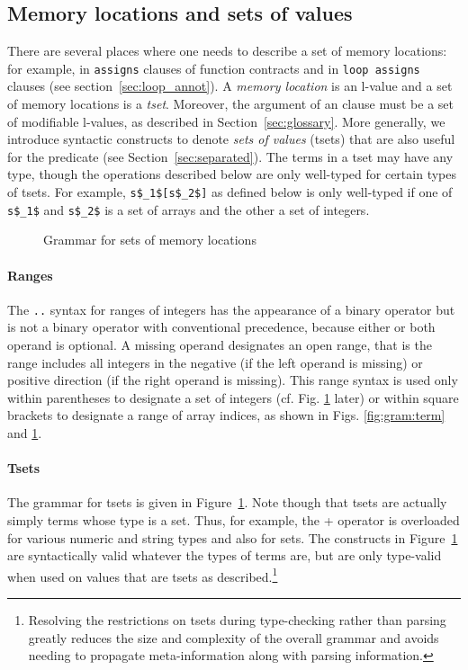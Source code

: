 \subsection{Memory locations and sets of values}
\label{sec:locations}

There are several places where one needs to describe a set of memory
locations: for example, in \lstinline|assigns| clauses of function contracts and
in \lstinline|loop assigns| clauses (see section~\ref{sec:loop_annot}).
A \emph{memory location} is an
l-value and a set of memory locations is a \emph{tset}.
Moreover, the argument of
an \assigns{} clause must be a set of modifiable l-values, as described in
Section~\ref{sec:glossary}.
More generally, we introduce syntactic constructs to denote \emph{sets of
  values} (tsets) that are also useful for the \separated predicate (see Section~\ref{sec:separated}). The terms in a tset may have any type, though the operations described below are only well-typed for certain types of tsets. For example, \lstinline|s$_1$[s$_2$]| as defined below is only well-typed if one of
\lstinline|s$_1$| and \lstinline|s$_2$| is a set of arrays and the other a set of integers.

\begin{figure}[htp]
  \begin{cadre}
      
    \end{cadre}
  \caption{Grammar for sets of memory locations}
\label{fig:gram:locations}
\end{figure}

\paragraph{Ranges}
The \lstinline|..| syntax for ranges of integers has the appearance of a
binary operator but is not a binary operator with conventional precedence,
because either or both operand is optional.
A missing operand designates an
open range, that is the range includes all integers in the negative (if the left operand is missing) or positive direction (if the right operand is missing).
This range syntax is used only within parentheses to designate a set of
integers (cf. Fig. \ref{fig:gram:locations} later) or within square brackets to designate a
range of array indices, as shown in Figs.  \ref{fig:gram:term} and
\ref{fig:gram:locations}.

\paragraph{Tsets}
The grammar for tsets is given in
Figure~\ref{fig:gram:locations}.
Note though that tsets are actually simply terms whose type is a set. Thus, for example, the + operator is overloaded for various numeric and string types and also for sets.
The constructs in Figure~\ref{fig:gram:locations} are syntactically valid whatever the types of terms are, but are only type-valid when used on values that are tsets as described.\footnote{Resolving the restrictions on tsets during type-checking rather than parsing greatly reduces the size and complexity of the overall grammar and avoids needing to
propagate meta-information along with parsing information.}

